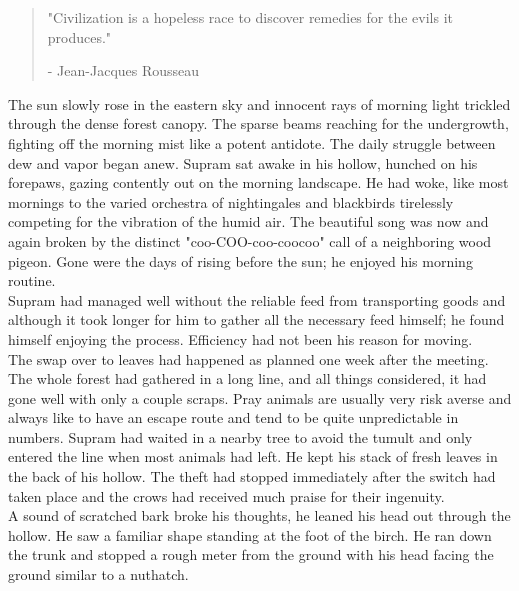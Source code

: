 \documentclass[smalldemyvopaper,11pt,twoside,onecolumn,openright,extrafontsizes]{memoir}
\begin{document}
\vspace{-1.3cm}
\begin{localsize}{10}
	\begin{quote}
		"Civilization is a hopeless race to discover remedies for the evils it produces."
		\begin{flushright}- Jean-Jacques Rousseau\end{flushright}
	\end{quote} 
\end{localsize}
\vspace{1cm}

The sun slowly rose in the eastern sky and innocent rays of morning light trickled through the dense forest canopy. The sparse beams reaching for the undergrowth, fighting off the morning mist like a potent antidote. The daily struggle between dew and vapor began anew. Supram sat awake in his hollow, hunched on his forepaws, gazing contently out on the morning landscape. He had woke, like most mornings to the varied orchestra of nightingales and blackbirds tirelessly competing for the vibration of the humid air. The beautiful song was now and again broken by the distinct "coo-COO-coo-coocoo" call of a neighboring wood pigeon. Gone were the days of rising before the sun; he enjoyed his morning routine.\\

Supram had managed well without the reliable feed from transporting goods and although it took longer for him to gather all the necessary feed himself; he found himself enjoying the process. Efficiency had not been his reason for moving.\\

The swap over to leaves had happened as planned one week after the meeting. The whole forest had gathered in a long line, and all things considered, it had gone well with only a couple scraps. Pray animals are usually very risk averse and always like to have an escape route and tend to be quite unpredictable in numbers. Supram had waited in a nearby tree to avoid the tumult and only entered the line when most animals had left. He kept his stack of fresh leaves in the back of his hollow. The theft had stopped immediately after the switch had taken place and the crows had received much praise for their ingenuity.\\

A sound of scratched bark broke his thoughts, he leaned his head out through the hollow. He saw a familiar shape standing at the foot of the birch. He ran down the trunk and stopped a rough meter from the ground with his head facing the ground similar to a nuthatch.\\
\end{document}
